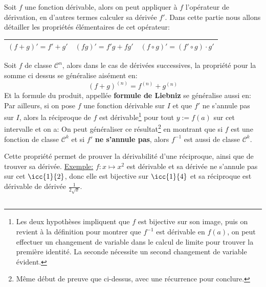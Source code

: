 Soit \(f\) une fonction dérivable, alors on peut appliquer à \(f\) l'opérateur de dérivation, en d'autres termes calculer sa dérivée \(f'\). Dans cette partie nous allons détailler les propriétés élémentaires de cet opérateur:
\begin{center}
   \renewcommand{\arraystretch}{1.5}%
   \setlength\arrayrulewidth{0.8pt}

   \begin{tabular}{| c | c | c |}
   \hline
   \((f + g)' = f' + g'\) & \((fg)' = f'g + fg'\)  & \((f \circ g)' = (f' \circ g) \cdot g'\) \\ [1ex]
   \hline
   \end{tabular}
\end{center}  
Soit \(f\) de classe \(\mathscr{C}^n\), alors dans le cas de dérivées successives, la propriété pour la somme ci dessus se généralise aisément en:
\[
   (f + g)^{(n)} = f^{(n)} + g^{(n)}
\]
Et la formule du produit, appellée \textbf{formule de Liebniz} se généralise aussi en:
Par ailleurs, si on pose \(f\) une fonction dérivable sur \(I\) et que \(f'\) ne s'annule pas sur \(I\), alors la réciproque de \(f\) est dérivable\footnote[1]{Les deux hypothèses impliquent que \(f\) est bijective sur son image, puis on revient à la définition pour montrer que \(f^{-1}\) est dérivable en \(f(a)\), on peut effectuer un changement de variable dans le calcul de limite pour trouver la première identité. La seconde nécessite un second changement de variable évident.} pour tout \(y := f(a)\) sur cet intervalle et on a:
On peut généraliser ce résultat\footnote[2]{Même début de preuve que ci-dessus, avec une récurrence pour conclure.} en montrant que si \(f\) est une fonction de classe \(\mathscr{C}^k\) et si \(f'\) \textbf{ne s'annule pas}, alors \(f^{-1}\) est aussi de classe \(\mathscr{C}^k\).\<

Cette propriété permet de prouver la dérivabilité d'une réciproque, ainsi que de trouver sa dérivée.\+
\underline{Exemple:} \(f: x \mapsto x^2\) est dérivable et sa dérivée ne s'annule pas sur cet \(\icc{1}{2}\), donc elle est bijective sur \(\icc{1}{4}\) et sa réciproque est dérivable de dérivée \(\frac{1}{2\sqrt{x}}\).

\subsection*{}

